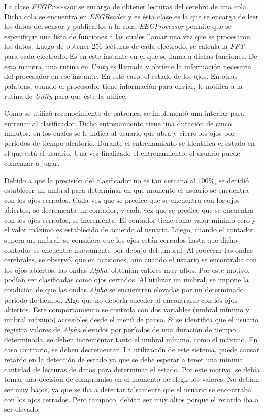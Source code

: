 La clase \emph{EEGProcessor} se encarga de obtener lecturas del cerebro de una cola. Dicha cola se encuentra en \emph{EEGReader} y es ésta clase es la que se encarga de leer los datos del sensor y publicarlos a la cola. \emph{EEGProcessor} permite que se especifique una lista de funciones a las cuales llamar una vez que se procesaron los datos. Luego de obtener 256 lecturas de cada electrodo, se calcula la \emph{FFT} para cada electrodo. Es en este instante en el que se llama a dichas funciones. De esta manera, una rutina en \emph{Unity} es llamada y obtiene la información necesaria del procesador en ese instante. En este caso, el estado de los ojos. En otras palabras, cuando el procesador tiene información para enviar, le notifica a la rutina de \emph{Unity} para que éste la utilice.

Como se utilizó reconocimiento de patrones, se implementó una interfaz para entrenar al clasificador. Dicho entrenamiento tiene una duración de cinco minutos, en los cuales se le indica al usuario que abra y cierre los ojos por períodos de tiempo aleatorio. Durante el entrenamiento se identifica el estado en el que está el usuario. Una vez finalizado el entrenamiento, el usuario puede comenzar a jugar.

Debido a que la precisión del clasificador no es tan cercana al $100\%$, se decidió establecer un umbral para determinar en que momento el usuario se encuentra con los ojos cerrados. Cada vez que se predice que se encuentra con los ojos abiertos, se decrementa un contador, y cada vez que se predice que se encuentra con los ojos cerrados, se incrementa. El contador tiene como valor mínimo cero y el valor máximo es establecido de acuerdo al usuario.  Luego, cuando el contador supera un umbral, se considera que los ojos están cerrados hasta que dicho contador se encuentre nuevamente por debajo del umbral. Al procesar las ondas cerebrales, se observó, que en ocasiones, aún cuando el usuario se encontraba con los ojos abiertos, las ondas \emph{Alpha}, obtenían valores muy altos. Por este motivo, podían ser clasificadas como ojos cerrados. Al utilizar un umbral, se impone la condición de que las ondas  \emph{Alpha} se encuentren elevadas por un determinado periodo de tiempo. Algo que no debería suceder al encontrarse con los ojos abiertos. Este comportamiento se controla con dos variables (umbral mínimo y umbral máximo) accesibles desde el menú de pausa. Si se identifica que el usuario registra valores de \emph{Alpha} elevados por períodos de una duración de tiempo determinada, se deben incrementar  tanto el umbral mínimo, como el máximo. En caso contrario, se deben decrementar. La utilización de este sistema, puede causar retardo en la detección de estado ya que se debe esperar a tener una mínima cantidad de lecturas de datos para determinar el estado. Por este motivo, se debía tomar una decisión de compromiso en el momento de elegir los valores. No debían ser muy bajos, ya que se iba a detectar falsamente que el usuario se encontraba con los ojos cerrados. Pero tampoco, debían ser muy altos porque el retardo iba a ser elevado.


